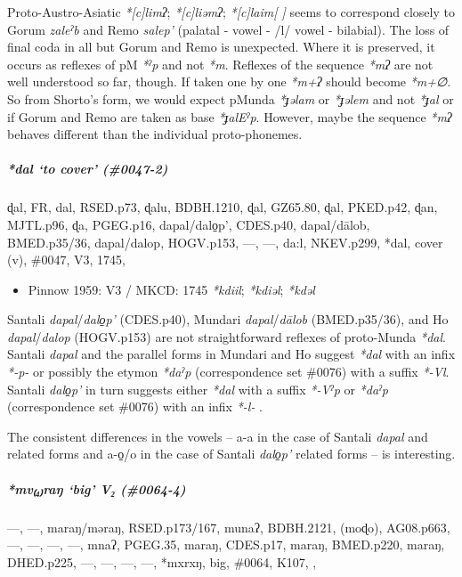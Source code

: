 \documentclass[a4paper,]{article}
\providecommand{\tightlist}{%
  \setlength{\itemsep}{0pt}\setlength{\parskip}{0pt}}
\let\oldsubparagraph\subparagraph
\renewcommand{\subparagraph}[1]{\oldsubparagraph{#1}\mbox{}}
\begin{document}
Proto-Austro-Asiatic \emph{*{[}c{]}limʔ}; \emph{*{[}c{]}liəmʔ};
\emph{*{[}c{]}laim{[} {]}} seems to correspond closely to Gorum
\emph{zaleˀb} and Remo \emph{salep'} (palatal - vowel - /l/ vowel -
bilabial). The loss of final coda in all but Gorum and Remo is
unexpected. Where it is preserved, it occurs as reflexes of pM
\emph{*ˀp} and not \emph{*m}. Reflexes of the sequence \emph{*mʔ} are
not well understood so far, though. If taken one by one \emph{*m+ʔ}
should become \emph{*m+∅}. So from Shorto's form, we would expect pMunda
\emph{*ɟəlam} or \emph{*ɟəlem} and not \emph{*ɟal} or if Gorum and Remo
are taken as base \emph{*ɟalEˀp}. However, maybe the sequence \emph{*mʔ}
behaves different than the individual proto-phonemes.

\subparagraph{\texorpdfstring{\emph{*dal} `to cover'
(\#0047-2)}{*dal to cover (\#0047-2)}}\label{dal-to-cover-0047-2}

ɖal, FR, dal, RSED.p73, ɖalu, BDBH.1210, ɖal, GZ65.80, ɖal, PKED.p42,
ɖan, MJTL.p96, ɖa, PGEG.p16, dapal/dalo̠p', CDES.p40, dapal/dālob,
BMED.p35/36, dapal/dalop, HOGV.p153, ---, ---, da:l, NKEV.p299, *dal,
cover (v), \#0047, V3, 1745,

\begin{itemize}
\tightlist
\item
  Pinnow 1959: V3 / MKCD: 1745 \emph{*kdiil}; \emph{*kdiəl};
  \emph{*kdəl}
\end{itemize}

Santali \emph{dapal}/\emph{dalo̠p'} (CDES.p40), Mundari
\emph{dapal}/\emph{dālob} (BMED.p35/36), and Ho
\emph{dapal}/\emph{dalop} (HOGV.p153) are not straightforward reflexes
of proto-Munda \emph{*dal}. Santali \emph{dapal} and the parallel forms
in Mundari and Ho suggest \emph{*dal} with an infix \emph{*-p-} or
possibly the etymon \emph{*daˀp} (correspondence set \#0076) with a
suffix \emph{*-Vl}. Santali \emph{dalo̠p'} in turn suggests either
\emph{*dal} with a suffix \emph{*-Vˀp} or \emph{*daˀp} (correspondence
set \#0076) with an infix \emph{*-l-} .

The consistent differences in the vowels -- a-a in the case of Santali
\emph{dapal} and related forms and a-o̠/o in the case of Santali
\emph{dalo̠p'} related forms -- is interesting.

\subparagraph{\texorpdfstring{\emph{*mv₍₄₎raŋ} `big' V₂
(\#0064-4)}{*mv₍₄₎raŋ big V₂ (\#0064-4)}}\label{mvraux14b-big-v-0064-4}

---, ---, maraŋ/məraŋ, RSED.p173/167, munaʔ, BDBH.2121, (moɖo),
AG08.p663, ---, ---, ---, ---, mnaʔ, PGEG.35, maraŋ, CDES.p17, maraŋ,
BMED.p220, maraŋ, DHED.p225, ---, ---, ---, ---, *mxrxŋ, big, \#0064,
K107, ,
\end{document}
